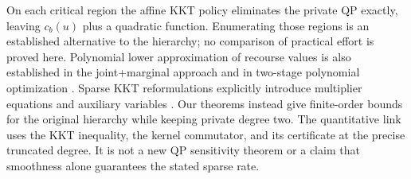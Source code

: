 On each critical region the affine KKT policy eliminates the private QP
exactly, leaving $c_b(u)$ plus a quadratic function. Enumerating those
regions is an established alternative to the hierarchy; no comparison
of practical effort is proved here. Polynomial lower approximation of
recourse values is also established in the joint+marginal approach
\cite{lasserre2010-joint-marginal} and in two-stage polynomial
optimization \cite{zhong2024-two-stage-polynomial}. Sparse KKT
reformulations explicitly introduce multiplier equations and auxiliary
variables \cite{qu2024-correlatively-sparse-lagrange}. Our theorems
instead give finite-order bounds for the original hierarchy while keeping
private degree two. The quantitative link uses the KKT inequality,
the kernel commutator, and its certificate at the precise truncated
degree. It is not a new QP sensitivity theorem or a claim that smoothness
alone guarantees the stated sparse rate.
